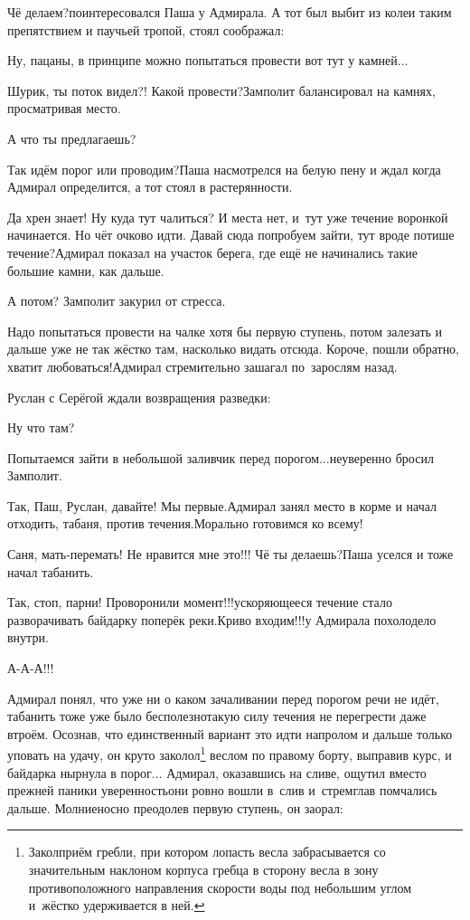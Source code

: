 \diagdash Чё делаем?\mdash поинтересовался Паша у Адмирала. А тот был выбит из колеи таким препятствием и паучьей тропой, стоял соображал:

\diagdash Ну, пацаны, в принципе можно попытаться провести вот тут у камней$\ldots$

\diagdash Шурик, ты поток видел?! Какой провести?\mdash Замполит балансировал на камнях, просматривая место.

\diagdash А что ты предлагаешь?

\diagdash Так идём порог или проводим?\mdash Паша насмотрелся на белую пену и ждал когда Адмирал определится, а тот стоял в растерянности. 

\diagdash Да хрен знает! Ну куда тут чалиться? И места нет, и~тут уже течение воронкой начинается. Но чёт очково идти. Давай сюда попробуем зайти, тут вроде потише течение?\mdash Адмирал показал на участок берега, где ещё не начинались такие большие камни, как дальше. 

\diagdash А потом? \mdash Замполит закурил от стресса.

\diagdash Надо попытаться провести на чалке хотя бы первую ступень, потом залезать и дальше уже не так жёстко там, насколько видать отсюда. Короче, пошли обратно, хватит любоваться!\mdash Адмирал стремительно зашагал по~зарослям назад.

Руслан с Серёгой ждали возвращения разведки:

\diagdash Ну что там?

\diagdash Попытаемся зайти в небольшой заливчик перед порогом$\ldots$\mdash неуверенно бросил Замполит.

\diagdash Так, Паш, Руслан, давайте! Мы первые.\mdash Адмирал занял место в корме и начал отходить, табаня, против течения.\mdash Морально готовимся ко всему!

\diagdash Саня, мать-перемать! Не нравится мне это!!! Чё ты делаешь?\mdash Паша уселся и тоже начал табанить.

\diagdash Так, стоп, парни! Проворонили момент!!!\mdash ускоряющееся течение стало разворачивать байдарку поперёк реки.\mdash Криво входим!!!\mdash у Адмирала похолодело внутри.

\diagdash А-А-А!!!

\renewcommand*{\thefootnote}{\fnsymbol{footnote}}
\setcounter{footnote}{0}
Адмирал понял, что уже ни о каком зачаливании перед порогом речи не идёт, табанить тоже уже было бесполезно\mdash такую силу течения не перегрести даже втроём. Осознав, что единственный вариант это идти напролом и дальше только уповать на удачу, он круто заколол\footnote{Закол\mdash приём гребли, при котором лопасть весла забрасывается со значительным наклоном корпуса гребца в сторону весла в зону противоположного направления скорости воды под небольшим углом и~жёстко удерживается в ней.} веслом по правому борту, выправив курс, и байдарка нырнула в порог$\ldots$ Адмирал, оказавшись на сливе, ощутил вместо прежней паники уверенность\mdash они ровно вошли в~слив и~стремглав помчались дальше. Молниеносно преодолев первую ступень, он заорал:

